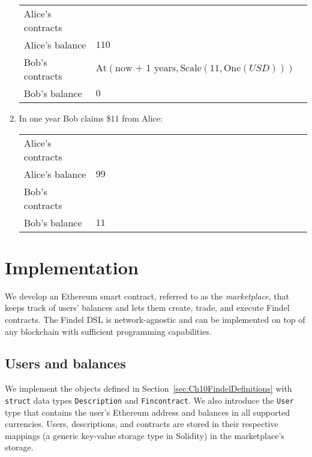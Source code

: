 \begin{enumerate}
	\begin{tabular}{| p{0.25\linewidth} | p{0.75\linewidth} |}
		\hline
		Alice's contracts & \\
		Alice's balance & $110$ \\
		Bob's contracts & \(\mathrm{At}(\text{now + 1 years},\mathrm{Scale}(11,\mathrm{One}(USD)))\) \\
		Bob's balance & $0$ \\
		\hline    
	\end{tabular}
	
	\item In one year Bob claims \$11 from Alice:
	
	\begin{tabular}{| p{0.25\linewidth} | p{0.75\linewidth} |}
		\hline
		Alice's contracts & \\
		Alice's balance & $99$ \\
		Bob's contracts & \\
		Bob's balance & $11$ \\
		\hline    
	\end{tabular}
	
\end{enumerate}




\section{Implementation} \label{sec:Ch10FindelImplementation}

We develop an Ethereum smart contract, referred to as the \textit{marketplace}, that keeps track of users' balances and lets them create, trade, and execute Findel contracts.
The Findel DSL is network-agnostic and can be implemented on top of any blockchain with sufficient programming capabilities.


\subsection{Users and balances}

We implement the objects defined in Section~\ref{sec:Ch10FindelDefinitions} with \texttt{struct} data types \texttt{Description} and \texttt{Fincontract}.
We also introduce the \texttt{User} type that contains the user's Ethereum address and balances in all supported currencies.
Users, descriptions, and contracts are stored in their respective mappings (a generic key-value storage type in Solidity) in the marketplace's storage.

